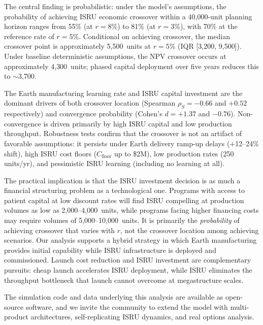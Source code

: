 \documentclass[preprint,12pt]{elsarticle}
\begin{document}
The central finding is probabilistic: under the model's assumptions, the probability of achieving ISRU economic crossover within a 40{,}000-unit planning horizon ranges from 55\% (at $r = 8\%$) to 81\% (at $r = 3\%$), with 70\% at the reference rate of $r = 5\%$. Conditional on achieving crossover, the median crossover point is approximately 5{,}500~units at $r = 5\%$ (IQR [3{,}200, 9{,}500]). Under baseline deterministic assumptions, the NPV crossover occurs at approximately 4{,}300~units; phased capital deployment over five years reduces this to $\sim$3{,}700.

The Earth manufacturing learning rate and ISRU capital investment are the dominant drivers of both crossover location (Spearman $\rho_S = -0.66$ and $+0.52$ respectively) and convergence probability (Cohen's $d = +1.37$ and $-0.76$). Non-convergence is driven primarily by high ISRU capital and low production throughput. Robustness tests confirm that the crossover is not an artifact of favorable assumptions: it persists under Earth delivery ramp-up delays ($+$12--24\% shift), high ISRU cost floors ($C_{\mathrm{floor}}$ up to \$2M), low production rates (250 units/yr), and pessimistic ISRU learning (including no learning at all).

The practical implication is that the ISRU investment decision is as much a financial structuring problem as a technological one. Programs with access to patient capital at low discount rates will find ISRU compelling at production volumes as low as 2{,}000--4{,}000~units, while programs facing higher financing costs may require volumes of 5{,}000--10{,}000~units. It is primarily the \emph{probability} of achieving crossover that varies with $r$, not the crossover location among achieving scenarios. Our analysis supports a hybrid strategy in which Earth manufacturing provides initial capability while ISRU infrastructure is deployed and commissioned. Launch cost reduction and ISRU investment are complementary pursuits: cheap launch accelerates ISRU deployment, while ISRU eliminates the throughput bottleneck that launch cannot overcome at megastructure scales.

The simulation code and data underlying this analysis are available as open-source software, and we invite the community to extend the model with multi-product architectures, self-replicating ISRU dynamics, and real options analysis.

\end{document}
